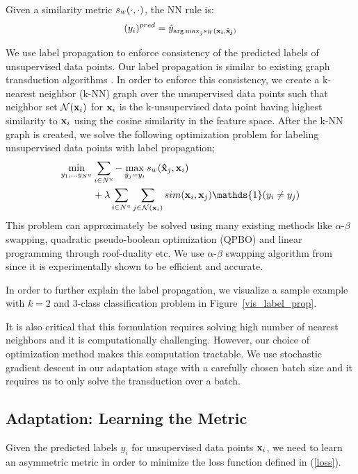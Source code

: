 Given a similarity metric $\sw(\cdot,\cdot)$, the NN rule is:
\begin{equation}
(y_i)^{pred} = \hat{y}_{{\arg\max}_j \sw(\mathbf{x_i}, \mathbf{\hat{x}_j})}
\end{equation}

We use label propagation to enforce consistency of the predicted labels of unsupervised data points. Our label propagation is similar to existing graph transduction algorithms \cite{label_prop1,label_prop2}. In order to enforce this consistency, we create a k-nearest neighbor (k-NN) graph over the unsupervised data points such that neighbor set $\mathcal{N}(\mathbf{x}_i)$ for $\mathbf{x}_i$ is the k-unsupervised data point having highest similarity to $\mathbf{x}_i$ using the cosine similarity in the feature space. After the k-NN graph is created, we solve the following optimization problem for labeling unsupervised data points with label propagation;
\begin{equation}
\begin{aligned}
\min_{y_1, \ldots y_{N^u}}  &\sum_{i \in N^u} - \max_{\hat{y}_j=y_i}  \sw(\mathbf{\hat{x}}_j,\mathbf{x}_{i}) \\
&+ \lambda
\sum_{i \in N^u} \sum_{j \in \mathcal{N}(\mathbf{x}_i)} sim(\mathbf{x}_i, \mathbf{x}_j) \mathds{1}(y_i \neq y_j)
\end{aligned}
\label{robtran}
\end{equation}
This problem can approximately be solved using many existing methods like $\alpha$-$\beta$ swapping, quadratic pseudo-boolean optimization (QPBO) and linear programming through roof-duality etc. We use $\alpha$-$\beta$ swapping algorithm from \cite{kolmogrovalphabeta} since it is experimentally shown to be efficient and accurate. 

In order to further explain the label propagation, we visualize a sample example with $k=2$ and $3$-class classification problem in Figure~\ref{vis_label_prop}. 

It is also critical that this formulation requires solving high number of nearest neighbors and it is computationally challenging. However, our choice of optimization method makes this computation tractable. We use stochastic gradient descent in our adaptation stage with a carefully chosen batch size and it requires us to only solve the transduction over a batch. %

\subsection{Adaptation: Learning the Metric}
\label{metric}
Given the predicted labels $y_i$ for unsupervised data points $\mathbf{x}_i$, we need to learn an asymmetric metric in order to minimize the loss function defined in (\ref{loss}). 

